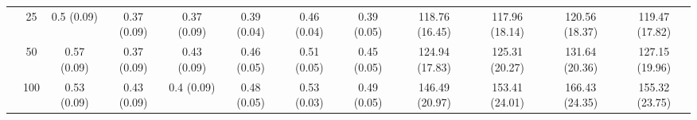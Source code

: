\documentclass[10pt]{article}
\theoremstyle{definition}
\begin{document}
\begin{table}[H]
\begin{center}
{\begin{tabular}{cc|ccc|ccc|cccc|}
  & 25  & 0.5 (0.09) & 0.37 (0.09) & 0.37 (0.09) & 0.39 (0.04) & 0.46 (0.04) & 0.39 (0.05) & 118.76 (16.45) & 117.96 (18.14) & 120.56 (18.37) & 119.47 (17.82) \\ 
 & 50  & 0.57 (0.09) & 0.37 (0.09) & 0.43 (0.09) & 0.46 (0.05) & 0.51 (0.05) & 0.45 (0.05) & 124.94 (17.83) & 125.31 (20.27) & 131.64 (20.36) & 127.15 (19.96) \\ 
  & 100  & 0.53 (0.09) & 0.43 (0.09) & 0.4 (0.09) & 0.48 (0.05) & 0.53 (0.03) & 0.49 (0.05) & 146.49 (20.97) & 153.41 (24.01) & 166.43 (24.35) & 155.32 (23.75) \\ 
\end{tabular}}
   \end{center}
      \vspace{-.5cm}
\end{table}
\end{document}
